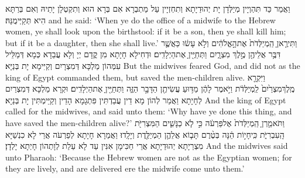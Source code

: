 {וַאֲמַר כַּד תִּהְוְיָין מְיַלְּדָן יָת יְהוּדַיָתָא וְתִחְזְיָין עַל מַתְבְרָא אִם בְּרָא הוּא וְתִקְטְלָן יָתֵיהּ וְאִם בְּרַתָּא הִיא תְּקַיְּימֻנַּהּ׃}
{and he said: ‘When ye do the office of a midwife to the Hebrew women, ye shall look upon the birthstool: if it be a son, then ye shall kill him; but if it be a daughter, then she shall live.’}{}
{וַתִּירֶ֤אןָ הַֽמְיַלְּדֹת֙ אֶת\maqqaf הָ֣אֱלֹהִ֔ים וְלֹ֣א עָשׂ֔וּ כַּאֲשֶׁ֛ר דִּבֶּ֥ר אֲלֵיהֶ֖ן מֶ֣לֶךְ מִצְרָ֑יִם וַתְּחַיֶּ֖יןָ אֶת\maqqaf הַיְלָדִֽים׃}
{וּדְחִילָא חָיָתָא מִן קֳדָם יְיָ וְלָא עֲבַדָא כְּמָא דְּמַלֵּיל עִמְּהוֹן מַלְכָּא דְּמִצְרָיִם וְקַיִּימָא יָת בְּנַיָּא׃}
{But the midwives feared God, and did not as the king of Egypt commanded them, but saved the men-children alive.}{}
{וַיִּקְרָ֤א מֶֽלֶךְ\maqqaf מִצְרַ֙יִם֙ לַֽמְיַלְּדֹ֔ת וַיֹּ֣אמֶר לָהֶ֔ן מַדּ֥וּעַ עֲשִׂיתֶ֖ן הַדָּבָ֣ר הַזֶּ֑ה וַתְּחַיֶּ֖יןָ אֶת\maqqaf הַיְלָדִֽים׃}
{וּקְרָא מַלְכָּא דְּמִצְרַיִם לְחָיָתָא וַאֲמַר לְהוֹן מָא דֵין עֲבַדְתִּין פִּתְגָמָא הָדֵין וְקַיֵּימְתִּין יָת בְּנַיָא׃}
{And the king of Egypt called for the midwives, and said unto them: ‘Why have ye done this thing, and have saved the men-children alive?’}{}
{וַתֹּאמַ֤רְןָ הַֽמְיַלְּדֹת֙ אֶל\maqqaf פַּרְעֹ֔ה כִּ֣י לֹ֧א כַנָּשִׁ֛ים הַמִּצְרִיֹּ֖ת הָֽעִבְרִיֹּ֑ת כִּֽי\maqqaf חָי֣וֹת הֵ֔נָּה בְּטֶ֨רֶם תָּב֧וֹא אֲלֵהֶ֛ן הַמְיַלֶּ֖דֶת וְיָלָֽדוּ׃}
{וַאֲמַרָא חָיָתָא לְפַרְעֹה אֲרֵי לָא כִנְשַׁיָּא מִצְרַיָתָא יְהוּדַיָתָא אֲרֵי חַכִּימָן אִנִּין עַד לָא עַלַת לְוָתְהוֹן חָיְתָא יָלְדָן׃}
{And the midwives said unto Pharaoh: ‘Because the Hebrew women are not as the Egyptian women; for they are lively, and are delivered ere the midwife come unto them.’}{}
